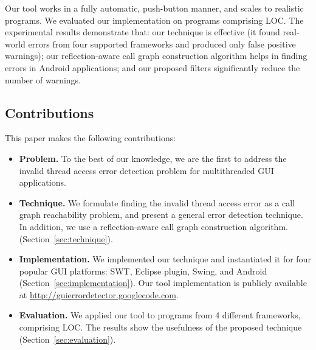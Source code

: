 Our tool works in a fully automatic, push-button manner,
and scales to realistic programs.
We evaluated our implementation on \subnum programs comprising \totaloc LOC.
The experimental results demonstrate
that: our technique is effective (it found \bugs real-world errors
from four supported frameworks and produced only \falses false positive warnings);
our reflection-aware call graph construction algorithm helps in
finding errors in Android applications;
and our proposed filters significantly reduce the number of warnings.


\subsection{Contributions}

This paper makes the following contributions:

\tinystep

\begin{itemize}
\item \textbf{Problem.} To the best of our knowledge, we are the first to address
the invalid thread access error detection problem for multithreaded GUI applications.

\tinystep

\item \textbf{Technique.} We formulate finding
the invalid thread access error as a call graph reachability problem,
and present a general error detection technique.
In addition, we use a reflection-aware
call graph construction algorithm. (Section~\ref{sec:technique}).

\tinystep

\item \textbf{Implementation.} We implemented our technique and
instantiated it for four
popular GUI platforms: SWT, Eclipse plugin, Swing, and Android (Section~\ref{sec:implementation}). Our
tool implementation is publicly available at
\url{http://guierrordetector.googlecode.com}.

\tinystep

\item \textbf{Evaluation.} We applied our tool to \subnum programs 
from 4 different frameworks, comprising \totaloc LOC. The results
show the usefulness of the proposed technique (Section~\ref{sec:evaluation}).

\end{itemize}

